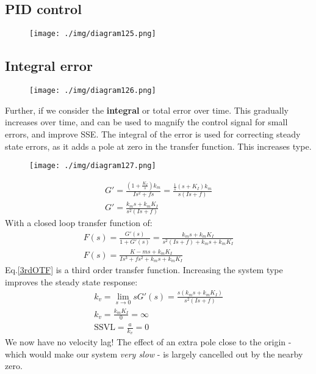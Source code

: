 \subsection{PID control}
\begin{figure}[H]
  \centerline{\texttt{[image: ./img/diagram125.png]}}
  \caption{}
\end{figure}
\subsection{Integral error}
\begin{figure}[H]
  \centerline{\texttt{[image: ./img/diagram126.png]}}
  \caption{}
\end{figure}
Further, if we consider the \textbf{integral} or total error over time. This gradually increases over time, and can be used to magnify the control signal for small errors, and improve SSE. The integral of the error is used for correcting steady state errors, as it adds a pole at zero in the transfer function. This increases type.
\begin{figure}[H]
  \centerline{\texttt{[image: ./img/diagram127.png]}}
  \caption{}
\end{figure}
\begin{gather}
  G' = \frac{\left(1 + \frac{K_I}{s}\right) k_m}{Is^2 + fs} = \frac{\frac{1}{s} \left(s + K_I \right)k_m}{s \left(Is + f\right)}\\
  G' = \frac{k_m s + k_m K_I}{s^2 \left(Is + f\right)}
\end{gather}
With a closed loop transfer function of:
\begin{gather}
  F(s) = \frac{G'(s)}{1 + G'(s)} = \frac{k_m s + k_m K_I}{s^2 \left( Is + f\right) + k_m s +k_m K_I}\\
  F(s) = \frac{K-m s + k_m K_I}{Is^3 + fs^2 + k_m s + k_m K_I} \label{3rdOTF}
\end{gather}
Eq.\ref{3rdOTF} is a third order transfer function. Increasing the system type improves the steady state response:
\begin{gather}
  k_v = \lim_{s\rightarrow 0} sG'(s) = \frac{s\left( k_m s + k_m K_I \right)}{s^2 \left( Is + f \right)}\\
  k_v = \frac{k_m K_I}{0} = \infty \\
  \textrm{SSVL} = \frac{a}{k_v} = 0
\end{gather}
We now have no velocity lag! The effect of an extra pole close to the origin - which would make our system \textit{very slow} - is largely cancelled out by the nearby zero.
